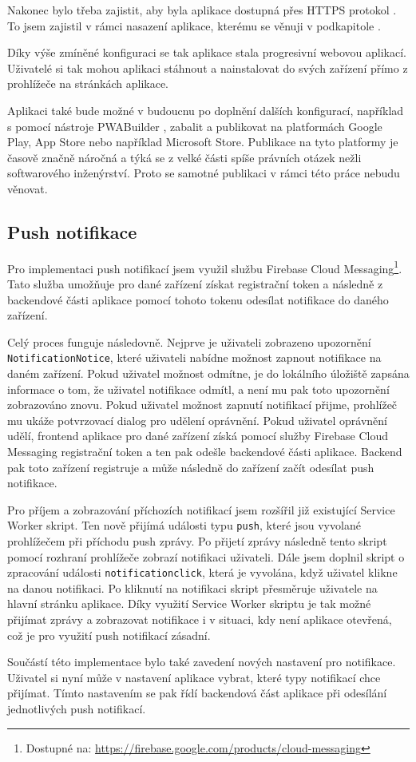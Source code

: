 Nakonec bylo třeba zajistit, aby byla aplikace dostupná přes HTTPS protokol \cite{PWABuilder}. To jsem zajistil v rámci nasazení aplikace, kterému se věnuji v podkapitole .

Díky výše zmíněné konfiguraci se tak aplikace stala progresivní webovou aplikací. Uživatelé si tak mohou aplikaci stáhnout a nainstalovat do svých zařízení přímo z prohlížeče na stránkách aplikace.

Aplikaci také bude možné v budoucnu po doplnění dalších konfigurací, například s pomocí nástroje PWABuilder \cite{PWABuilder}, zabalit a publikovat na platformách Google Play, App Store nebo například Microsoft Store. Publikace na tyto platformy je časově značně náročná a týká se z velké části spíše právních otázek nežli softwarového inženýrství. Proto se samotné publikaci v rámci této práce nebudu věnovat.

\subsection{Push notifikace}

Pro implementaci push notifikací jsem využil službu Firebase Cloud Messaging\footnote{Dostupné na: \href{https://firebase.google.com/products/cloud-messaging}{https://firebase.google.com/products/cloud-messaging}}. Tato služba umožňuje pro dané zařízení získat registrační token a následně z backendové části aplikace pomocí tohoto tokenu odesílat notifikace do daného zařízení.

Celý proces funguje následovně. Nejprve je uživateli zobrazeno upozornění \texttt{NotificationNotice}, které uživateli nabídne možnost zapnout notifikace na daném zařízení. Pokud uživatel možnost odmítne, je do lokálního úložiště zapsána informace o tom, že uživatel notifikace odmítl, a není mu pak toto upozornění zobrazováno znovu. Pokud uživatel možnost zapnutí notifikací přijme, prohlížeč mu ukáže potvrzovací dialog pro udělení oprávnění. Pokud uživatel oprávnění udělí, frontend aplikace pro dané zařízení získá pomocí služby Firebase Cloud Messaging registrační token a ten pak odešle backendové části aplikace. Backend pak toto zařízení registruje a může následně do zařízení začít odesílat push notifikace.

Pro příjem a zobrazování příchozích notifikací jsem rozšířil již existující Service Worker skript. Ten nově přijímá události typu \texttt{push}, které jsou vyvolané prohlížečem při příchodu push zprávy. Po přijetí zprávy následně tento skript pomocí rozhraní prohlížeče zobrazí notifikaci uživateli. Dále jsem doplnil skript o zpracování události \texttt{notificationclick}, která je vyvolána, když uživatel klikne na danou notifikaci. Po kliknutí na notifikaci skript přesměruje uživatele na hlavní stránku aplikace. Díky využití Service Worker skriptu je tak možné přijímat zprávy a zobrazovat notifikace i v situaci, kdy není aplikace otevřená, což je pro využití push notifikací zásadní.

Součástí této implementace bylo také zavedení nových nastavení pro notifikace. Uživatel si nyní může v nastavení aplikace vybrat, které typy notifikací chce přijímat. Tímto nastavením se pak řídí backendová část aplikace při odesílání jednotlivých push notifikací.
